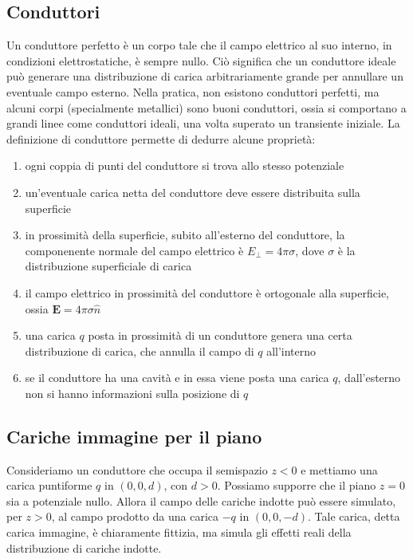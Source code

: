 \documentclass[a4paper,11pt]{book}
\renewcommand{\vec}[1]{\mathbf{#1}}
\theoremstyle{theorem}
\theoremstyle{definition}
\begin{document}
\subsection{Conduttori}
Un conduttore perfetto è un corpo tale che il campo elettrico al suo interno, in condizioni elettrostatiche, è sempre nullo. Ciò significa che un conduttore ideale può generare una distribuzione di carica arbitrariamente grande per annullare un eventuale campo esterno. Nella pratica, non esistono conduttori perfetti, ma alcuni corpi (specialmente metallici) sono buoni conduttori, ossia si comportano a grandi linee come conduttori ideali, una volta superato un transiente iniziale. La definizione di conduttore permette di dedurre alcune proprietà:
\begin{enumerate}
	\item ogni coppia di punti del conduttore si trova allo stesso potenziale
	\item un'eventuale carica netta del conduttore deve essere distribuita sulla superficie
	\item in prossimità della superficie, subito all'esterno del conduttore, la componenente normale del campo elettrico è $E_\perp=4\pi\sigma$, dove $\sigma$ è la distribuzione superficiale di carica
	\item il campo elettrico in prossimità del conduttore è ortogonale alla superficie, ossia $\vec{E}=4\pi\sigma\hat{n}$
	\item una carica $q$ posta in prossimità di un conduttore genera una certa distribuzione di carica, che annulla il campo di $q$ all'interno
	\item se il conduttore ha una cavità e in essa viene posta una carica $q$, dall'esterno non si hanno informazioni sulla posizione di $q$
\end{enumerate}
\subsection{Cariche immagine per il piano}
Consideriamo un conduttore che occupa il semispazio $z<0$ e mettiamo una carica puntiforme $q$ in $(0,0,d)$, con $d>0$. Possiamo supporre che il piano $z=0$ sia a potenziale nullo. Allora il campo delle cariche indotte può essere simulato, per $z>0$, al campo prodotto da una carica $-q$ in $(0,0,-d)$. Tale carica, detta carica immagine, è chiaramente fittizia, ma simula gli effetti reali della distribuzione di cariche indotte.
\end{document}
